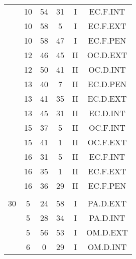 \documentclass[12pt, a4paper]{article}
\begin{document}
\begin{multicols}{3}
{\begin{tabular}{c c c c c c}
	 	 	 	 & 10 & 54 & 31 & I & EC.F.INT\\%
	 	 	 	 & 10 & 58 & 5 & I & EC.F.EXT\\%
	 	 	 	 & 10 & 58 & 47 & I & EC.F.PEN\\%
	 	 	 	 & 12 & 46 & 45 & II & OC.D.EXT\\%
	 	 	 	 & 12 & 50 & 41 & II & OC.D.INT\\%
	 	 	 	 & 13 & 40 & 7 & II & EC.D.PEN\\%
	 	 	 	 & 13 & 41 & 35 & II & EC.D.EXT\\%
	 	 	 	 & 13 & 45 & 31 & II & EC.D.INT\\%
	 	 	 	 & 15 & 37 & 5 & II & OC.F.INT\\%
	 	 	 	 & 15 & 41 & 1 & II & OC.F.EXT\\%
	 	 	 	 & 16 & 31 & 5 & II & EC.F.INT\\%
	 	 	 	 & 16 & 35 & 1 & II & EC.F.EXT\\%
	 	 	 	 & 16 & 36 & 29 & II & EC.F.PEN\\%
	 	 	 	 & & & & & \\%
	 	 	 	30 & 5 & 24 & 58 & I & PA.D.EXT\\%
	 	 	 	 & 5 & 28 & 34 & I & PA.D.INT\\%
	 	 	 	 & 5 & 56 & 53 & I & OM.D.EXT\\%
	 	 	 	 & 6 & 0 & 29 & I & OM.D.INT\\%
	 	 \end{tabular}
 	}
\end{multicols}
\end{document}
